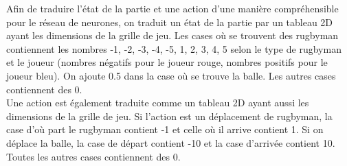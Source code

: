 \documentclass[a4paper,12pt]{article}
\begin{document}
Afin de traduire l'état de la partie et une action d'une manière compréhensible pour le réseau de neurones, on traduit un état de la partie par un tableau 2D ayant les dimensions de la grille de jeu. Les cases où se trouvent des rugbyman contiennent les nombres -1, -2, -3, -4, -5, 1, 2, 3, 4, 5 selon le type de rugbyman et le joueur (nombres négatifs pour le joueur rouge, nombres positifs pour le joueur bleu). On ajoute 0.5 dans la case où se trouve la balle. Les autres cases contiennent des 0.\\
Une action est également traduite comme un tableau 2D ayant aussi les dimensions de la grille de jeu. Si l'action est un déplacement de rugbyman, la case d'où part le rugbyman contient -1 et celle où il arrive contient 1. Si on déplace la balle, la case de départ contient -10 et la case d'arrivée contient 10. Toutes les autres cases contiennent des 0.\\
\end{document}
